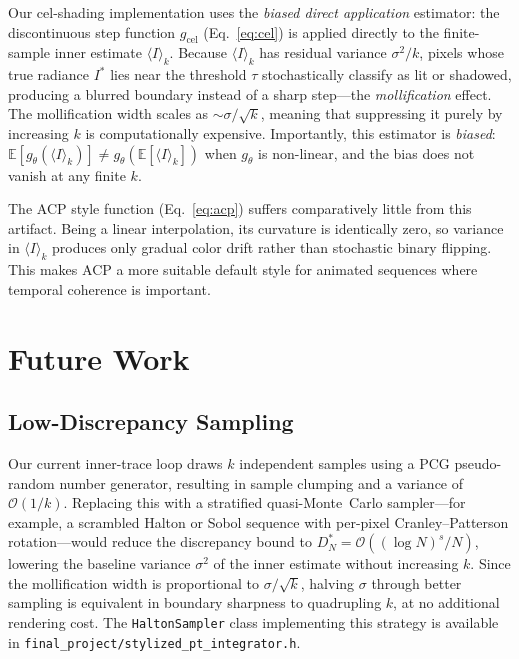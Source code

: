 \documentclass{article}
\begin{document}
Our cel-shading implementation uses the \emph{biased direct application} estimator: the discontinuous step function $g_{\text{cel}}$ (Eq.~\ref{eq:cel}) is applied directly to the finite-sample inner estimate $\langle I \rangle_k$.
Because $\langle I \rangle_k$ has residual variance $\sigma^2 / k$, pixels whose true radiance $I^*$ lies near the threshold $\tau$ stochastically classify as lit or shadowed, producing a blurred boundary instead of a sharp step---the \emph{mollification} effect.
The mollification width scales as $\sim\!\sigma / \sqrt{k}$, meaning that suppressing it purely by increasing $k$ is computationally expensive.
Importantly, this estimator is \emph{biased}: $\mathbb{E}[g_\theta(\langle I \rangle_k)] \neq g_\theta(\mathbb{E}[\langle I \rangle_k])$ when $g_\theta$ is non-linear, and the bias does not vanish at any finite $k$.

The ACP style function (Eq.~\ref{eq:acp}) suffers comparatively little from this artifact.
Being a linear interpolation, its curvature is identically zero, so variance in $\langle I \rangle_k$ produces only gradual color drift rather than stochastic binary flipping.
This makes ACP a more suitable default style for animated sequences where temporal coherence is important.


\section{Future Work}
\label{sec:future}

\subsection{Low-Discrepancy Sampling}

Our current inner-trace loop draws $k$ independent samples using a PCG pseudo-random number generator, resulting in sample clumping and a variance of $\mathcal{O}(1/k)$.
Replacing this with a stratified quasi-Monte~Carlo sampler---for example, a scrambled Halton or Sobol sequence with per-pixel Cranley--Patterson rotation---would reduce the discrepancy bound to $D_N^* = \mathcal{O}((\log N)^s / N)$, lowering the baseline variance $\sigma^2$ of the inner estimate without increasing $k$.
Since the mollification width is proportional to $\sigma / \sqrt{k}$, halving $\sigma$ through better sampling is equivalent in boundary sharpness to quadrupling $k$, at no additional rendering cost.
The \texttt{HaltonSampler} class implementing this strategy is available in \texttt{final\_project/stylized\_pt\_integrator.h}.
\end{document}
